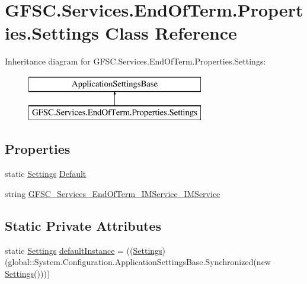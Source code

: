 \hypertarget{class_g_f_s_c_1_1_services_1_1_end_of_term_1_1_properties_1_1_settings}{}\section{G\+F\+S\+C.\+Services.\+End\+Of\+Term.\+Properties.\+Settings Class Reference}
\label{class_g_f_s_c_1_1_services_1_1_end_of_term_1_1_properties_1_1_settings}
Inheritance diagram for G\+F\+S\+C.\+Services.\+End\+Of\+Term.\+Properties.\+Settings\+:\begin{figure}[H]
\begin{center}
\leavevmode
\includegraphics[height=2.000000cm]{class_g_f_s_c_1_1_services_1_1_end_of_term_1_1_properties_1_1_settings}
\end{center}
\end{figure}
\subsection*{Properties}
\begin{DoxyCompactItemize}
\item 
static \mbox{\hyperlink{class_g_f_s_c_1_1_services_1_1_end_of_term_1_1_properties_1_1_settings}{Settings}} \mbox{\hyperlink{class_g_f_s_c_1_1_services_1_1_end_of_term_1_1_properties_1_1_settings_a35a9cb330e88645cec6ec30329bb57ed}{Default}}
\item 
string \mbox{\hyperlink{class_g_f_s_c_1_1_services_1_1_end_of_term_1_1_properties_1_1_settings_ad741ee9474043185664f1648c6d0cb20}{G\+F\+S\+C\+\_\+\+Services\+\_\+\+End\+Of\+Term\+\_\+\+I\+M\+Service\+\_\+\+I\+M\+Service}}
\end{DoxyCompactItemize}
\subsection*{Static Private Attributes}
\begin{DoxyCompactItemize}
\item 
static \mbox{\hyperlink{class_g_f_s_c_1_1_services_1_1_end_of_term_1_1_properties_1_1_settings}{Settings}} \mbox{\hyperlink{class_g_f_s_c_1_1_services_1_1_end_of_term_1_1_properties_1_1_settings_aa8f1787565437fff472a7cefaa9af3e1}{default\+Instance}} = ((\mbox{\hyperlink{class_g_f_s_c_1_1_services_1_1_end_of_term_1_1_properties_1_1_settings}{Settings}})(global\+::\+System.\+Configuration.\+Application\+Settings\+Base.\+Synchronized(new \mbox{\hyperlink{class_g_f_s_c_1_1_services_1_1_end_of_term_1_1_properties_1_1_settings}{Settings}}())))
\end{DoxyCompactItemize}


